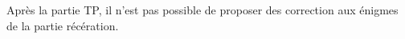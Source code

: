 Après la partie TP, il n'est pas possible de proposer des correction aux énigmes de la partie récération.



